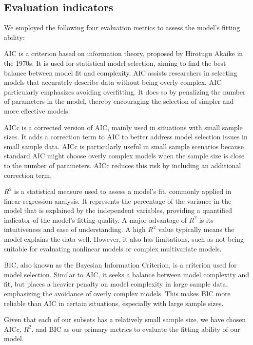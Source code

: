 \documentclass[11pt]{article}
\begin{document}
\begin{linenumbers}
        \subsection{Evaluation indicators}
        We employed the following four evaluation metrics to assess the model's fitting ability:

        AIC is a criterion based on information theory, proposed by Hirotugu Akaike in the 1970s. It is used for statistical model selection, aiming to find the best balance between model fit and complexity. AIC assists researchers in selecting models that accurately describe data without being overly complex. AIC particularly emphasizes avoiding overfitting. It does so by penalizing the number of parameters in the model, thereby encouraging the selection of simpler and more effective models.
        
        AICc is a corrected version of AIC, mainly used in situations with small sample sizes. It adds a correction term to AIC to better address model selection issues in small sample data. AICc is particularly useful in small sample scenarios because standard AIC might choose overly complex models when the sample size is close to the number of parameters. AICc reduces this risk by including an additional correction term.
        
        $R^2$ is a statistical measure used to assess a model's fit, commonly applied in linear regression analysis. It represents the percentage of the variance in the model that is explained by the independent variables, providing a quantified indicator of the model's fitting quality. A major advantage of $R^2$ is its intuitiveness and ease of understanding. A high $R^2$ value typically means the model explains the data well. However, it also has limitations, such as not being suitable for evaluating nonlinear models or complex multivariate models.
        
        BIC, also known as the Bayesian Information Criterion, is a criterion used for model selection. Similar to AIC, it seeks a balance between model complexity and fit, but places a heavier penalty on model complexity in large sample data, emphasizing the avoidance of overly complex models. This makes BIC more reliable than AIC in certain situations, especially with large sample sizes.
        
        Given that each of our subsets has a relatively small sample size, we have chosen AICc, $R^2$, and BIC as our primary metrics to evaluate the fitting ability of our model.

\end{linenumbers}
\end{document}
